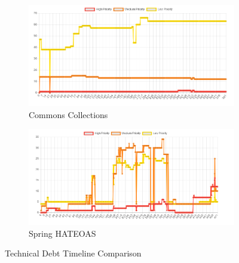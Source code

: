 \documentclass{mpaper}
\begin{document}
\begin{figure}[htp]
	\centering
	\begin{subfigure}{.45\textwidth}
		\includegraphics[width=\linewidth]{images/collections_td_timeline.png}
		\caption{Commons Collections}
		\label{fig:collections-td-timeline}
	\end{subfigure}
	\begin{subfigure}{.45\textwidth}
		\includegraphics[width=\linewidth]{images/spring_td_timeline.png}
		\caption{Spring HATEOAS}
		\label{fig:spring-td-timeline}
	\end{subfigure}
	\caption{Technical Debt Timeline Comparison}
	\label{fig:td-timeline}
\end{figure}
\end{document}
